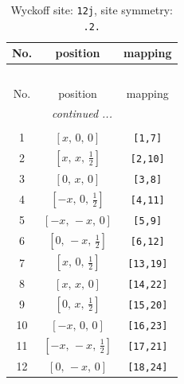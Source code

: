 \documentclass[fleqn,8pt]{jsarticle}
\begin{document}
\begin{longtable}{ccc}
\caption{Wyckoff site: {\tt 12j}, site symmetry: {\tt .2.}}
 \\
 \hline \hline
No. & position & mapping \\ \hline \endfirsthead

\multicolumn{2}{l}{\tablename\ \thetable{}} \\
 \hline \hline
No. & position & mapping \\ \hline \endhead

 \hline \hline
\multicolumn{2}{r}{\footnotesize\it continued ...} \\ \endfoot

 \hline \hline
\multicolumn{2}{r}{} \\ \endlastfoot

1 & $\left[ x,\, 0,\, 0 \right]$ & {\tt [1,7]} \\ \hline
2 & $\left[ x,\, x,\, \frac{1}{2} \right]$ & {\tt [2,10]} \\ \hline
3 & $\left[ 0,\, x,\, 0 \right]$ & {\tt [3,8]} \\ \hline
4 & $\left[ - x,\, 0,\, \frac{1}{2} \right]$ & {\tt [4,11]} \\ \hline
5 & $\left[ - x,\, - x,\, 0 \right]$ & {\tt [5,9]} \\ \hline
6 & $\left[ 0,\, - x,\, \frac{1}{2} \right]$ & {\tt [6,12]} \\ \hline
7 & $\left[ x,\, 0,\, \frac{1}{2} \right]$ & {\tt [13,19]} \\ \hline
8 & $\left[ x,\, x,\, 0 \right]$ & {\tt [14,22]} \\ \hline
9 & $\left[ 0,\, x,\, \frac{1}{2} \right]$ & {\tt [15,20]} \\ \hline
10 & $\left[ - x,\, 0,\, 0 \right]$ & {\tt [16,23]} \\ \hline
11 & $\left[ - x,\, - x,\, \frac{1}{2} \right]$ & {\tt [17,21]} \\ \hline
12 & $\left[ 0,\, - x,\, 0 \right]$ & {\tt [18,24]} \\
\end{longtable}
\renewcommand{\arraystretch}{1.2}
\end{document}
